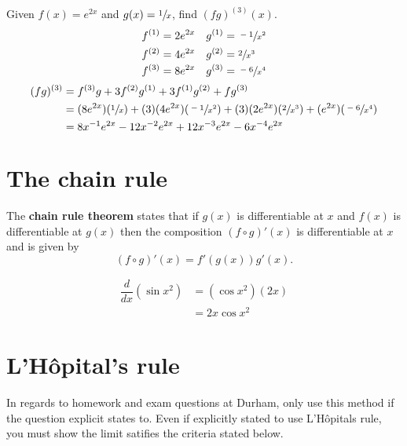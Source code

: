 \begin{example}
    Given $f(x)=e^{2x}$ and $g(x)=\sfrac1x$, find $(fg)^{(3)}(x)$.
    \begin{align*}
        f^{(1)}&=2e^{2x}&g^{(1)}&=\sfrac{-1}{x^2}\\
        f^{(2)}&=4e^{2x}&g^{(2)}&=\sfrac{2}{x^3}\\
        f^{(3)}&=8e^{2x}&g^{(3)}&=\sfrac{-6}{x^4}\\
    \end{align*}
    \vspace{-3em}
    \begin{align*}
        (fg)^{(3)}&=f^{(3)}g+3f^{(2)}g^{(1)}+3f^{(1)}g^{(2)}+fg^{(3)}\\
        &=(8e^{2x})(\sfrac1x)+(3)(4e^{2x})(\sfrac{-1}{x^2})+(3)(2e^{2x})(\sfrac2{x^3})+(e^{2x})(\sfrac{-6}{x^4})\\
        &=8x^{-1}e^{2x}-12x^{-2}e^{2x}+12x^{-3}e^{2x}-6x^{-4}e^{2x}
    \end{align*}
\end{example}

\section{The chain rule}

\begin{theorem}
    The \textbf{chain rule theorem} states that if $g(x)$ is differentiable at $x$ and $f(x)$ is differentiable at $g(x)$ then the composition $(f\circ g)'(x)$ is differentiable at $x$ and is given by \[(f\circ g)'(x)=f'(g(x))g'(x).\]
\end{theorem}

\begin{example}
    \begin{align*}
        \dfrac d{dx}\left(\sin{x^2}\right)&=\left(\cos{x^2}\right)(2x)\\
        &=2x\cos{x^2}
    \end{align*}
\end{example} 

\section{L'H\^opital's rule}

\begin{remark}
    In regards to homework and exam questions at Durham, only use this method if the question explicit states to. Even if explicitly stated to use L'H\^opitals rule, you must show the limit satifies the criteria stated below.
\end{remark}

